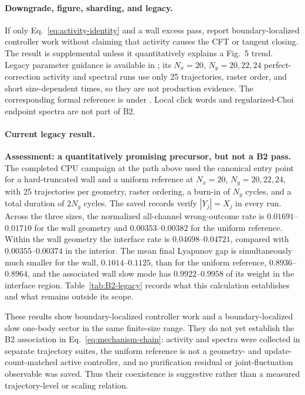 \documentclass[aps,prx,twocolumn,floatfix,nofootinbib,superscriptaddress,longbibliography]{revtex4-2}
\begin{document}
\paragraph*{Downgrade, figure, sharding, and legacy.}
If only Eq.~\eqref{eq:activity-identity} and a wall excess pass, report boundary-localized
controller work without claiming that activity causes the CFT or tangent closing.  The
result is supplemental unless it quantitatively explains a Fig.~5 trend.
Legacy parameter guidance is available in
; its $N_x=20$, $N_y=20,22,24$
perfect-correction activity and spectral runs use only 25 trajectories, raster order, and
short size-dependent times, so they are not production evidence.  The corresponding
formal reference is under .  Local click
words and regularized-Choi endpoint spectra are
not part of B2.

\paragraph*{Current legacy result.}
\textbf{Assessment: a quantitatively promising precursor, but not a B2 pass.}
The completed CPU campaign at the path above used the canonical
 entry point for a hard-truncated wall and a
uniform reference at $N_x=20$, $N_y=20,22,24$, with 25 trajectories per geometry,
raster ordering, a burn-in of $N_y$ cycles, and a total duration of $2N_y$ cycles.  The
saved records verify $|Y_j|=X_j$ in every run.  Across the three sizes, the normalized
all-channel wrong-outcome rate is $0.01691$--$0.01710$ for the wall geometry and
$0.00353$--$0.00382$ for the uniform reference.  Within the wall geometry the interface
rate is $0.04698$--$0.04721$, compared with $0.00355$--$0.00374$ in the interior.  The
mean final Lyapunov gap is simultaneously much smaller for the wall,
$0.1014$--$0.1125$, than for the uniform reference, $0.8936$--$0.8964$, and the
associated wall slow mode has $0.9922$--$0.9958$ of its weight in the interface region.
Table~\ref{tab:B2-legacy} records what this calculation establishes and what remains
outside its scope.

These results show boundary-localized controller work and a boundary-localized slow
one-body sector in the same finite-size range.  They do not yet establish the B2
association in Eq.~\eqref{eq:mechanism-chain}: activity and spectra were collected in
separate trajectory suites, the uniform reference is not a geometry- and
update-count-matched active controller, and no purification residual or joint-fluctuation
observable was saved.  Thus their coexistence is suggestive rather than a measured
trajectory-level or scaling relation.
\end{document}
